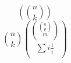 \documentclass[10pt, twoside]{lecturenotes}
\begin{document}
\[
\left(
\binom n k
\right)
\]
\[
\binom n k
\binom {\binom{\binom {n} {p}} m} {\sum{i}\frac{1}{i}}
\]
\end{document}
